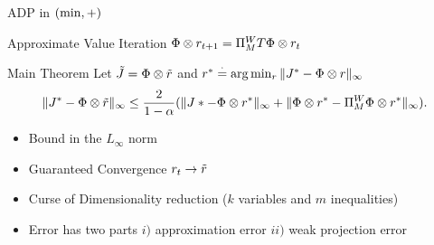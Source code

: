 \documentclass[10pt,handout]{beamer}
\begin{document}
\begin{frame}[fragile]{ADP in $(\min,+)$}
\begin{block}{Approximate Value Iteration}
$\Phi \otimes r_{t+1}=\Pi^W_M T \Phi \otimes r_t$
\end{block}

\begin{block}{Main Theorem}
Let $\tilde{J}=\Phi \otimes \tilde{r}$ and $r^*\stackrel{\cdot}{=}\arg\min_{r}\|J^*-\Phi \otimes r\|_\infty$
\begin{align*}
\|J^*-\Phi\otimes \tilde{r}\|_\infty\leq \frac{2}{1-\alpha}(\|J*-\Phi\otimes r^*\|_\infty+\|\Phi\otimes r^*-\Pi_M^W \Phi\otimes r^*\|_\infty).
\end{align*}
\begin{itemize}
\item Bound in the $L_\infty$ norm
\item Guaranteed Convergence $r_t \rightarrow \tilde{r}$
\item Curse of Dimensionality reduction ($k$ variables and $m$ inequalities)
\item Error has two parts $i)$ approximation error $ii)$ weak projection error
\end{itemize}
\end{block}
\end{frame}
\end{document}
